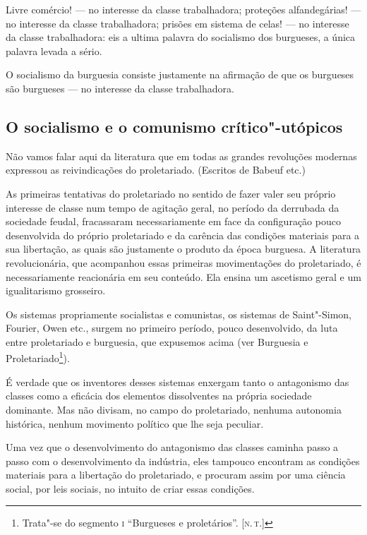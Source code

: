 Livre comércio!  ---  no interesse da classe trabalhadora; proteções
alfandegárias!  ---  no interesse da classe trabalhadora; prisões em
sistema de celas!  ---  no interesse da classe trabalhadora: eis a ultima
palavra do socialismo dos burgueses, a única palavra levada a sério.

O socialismo da burguesia consiste justamente na afirmação de que os
burgueses são burgueses  ---  no interesse da classe trabalhadora.

\subsection[O socialismo e o comunismo crítico"-utópicos]{O socialismo e o comunismo crítico"-utópicos}

Não vamos falar aqui da literatura que em todas as grandes revoluções
modernas expressou as reivindicações do proletariado. (Escritos de
Babeuf etc.)

As primeiras tentativas do proletariado no sentido de fazer valer seu
próprio interesse de classe num tempo de agitação geral, no período da
derrubada da sociedade feudal, fracassaram necessariamente em face da
configuração pouco desenvolvida do próprio proletariado e da carência
das condições materiais para a sua libertação, as quais são justamente
o produto da época burguesa. A literatura revolucionária, que
acompanhou essas primeiras movimentações do proletariado, é
necessariamente reacionária em seu conteúdo. Ela ensina um ascetismo
geral e um igualitarismo grosseiro.

Os sistemas propriamente socialistas e comunistas, os sistemas
de Saint"-Simon, Fourier, Owen etc., surgem no primeiro período, pouco
desenvolvido, da luta entre proletariado e burguesia, que expusemos
acima (ver Burguesia e
Proletariado\footnote{ Trata"-se do segmento \textsc{i} ``Burgueses e
proletários''. [\textsc{n.\,t.}]}).

É verdade que os inventores desses sistemas enxergam tanto o antagonismo
das classes como a eficácia dos elementos dissolventes na própria
sociedade dominante. Mas não divisam, no campo do proletariado, nenhuma
autonomia histórica, nenhum movimento político que lhe seja peculiar.

Uma vez que o desenvolvimento do antagonismo das classes caminha passo a
passo com o desenvolvimento da indústria, eles tampouco encontram as
condições materiais para a libertação do proletariado, e procuram assim
por uma ciência social, por leis sociais, no intuito de criar essas
condições.

